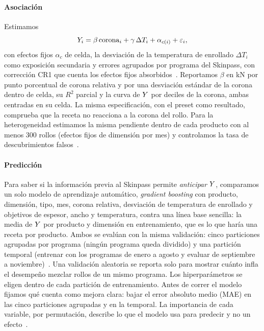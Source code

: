 \paragraph{Asociación} Estimamos
\begin{equation}
Y_i = \beta\, \mathrm{corona}_i + \gamma\, \Delta T_i + \alpha_{c(i)} + \varepsilon_i ,
\label{eq:fe}
\end{equation}
con efectos fijos $\alpha_c$ de celda, la desviación de la temperatura de enrollado $\Delta T_i$ como exposición
secundaria y errores agrupados por programa del Skinpass, con corrección CR1 que cuenta los efectos fijos
absorbidos~\cite{cameron2015}. Reportamos $\beta$ en kN por punto porcentual de corona relativa y por una desviación
estándar de la corona dentro de celda, su $R^2$ parcial y la curva de $Y$ por deciles de la corona, ambas centradas en
su celda. La misma especificación, con el preset como resultado, comprueba que la receta no reacciona a la corona del
rollo. Para la heterogeneidad estimamos la misma pendiente dentro de cada producto con al menos 300 rollos (efectos fijos
de dimensión por mes) y controlamos la tasa de descubrimientos falsos~\cite{benjamini1995}.

\paragraph{Predicción} Para saber si la información previa al Skinpass permite \emph{anticipar} $Y$, comparamos un
solo modelo de aprendizaje automático, \emph{gradient boosting} con producto, dimensión, tipo, mes, corona relativa,
desviación de temperatura de enrollado y objetivos de espesor, ancho y temperatura, contra una línea base sencilla: la
media de $Y$ por producto y dimensión en entrenamiento, que es lo que haría una receta por producto. Ambos se evalúan
con la misma validación: cinco particiones agrupadas por programa (ningún programa queda dividido) y una partición
temporal (entrenar con los programas de enero a agosto y evaluar de septiembre a noviembre)~\cite{roberts2017}. Una
validación aleatoria se reporta solo para mostrar cuánto infla el desempeño mezclar rollos de un mismo programa. Los
hiperparámetros se eligen dentro de cada partición de entrenamiento. Antes de correr el modelo fijamos qué cuenta como
mejora clara: bajar el error absoluto medio (MAE) en las cinco particiones agrupadas y en la temporal. La importancia de
cada variable, por permutación, describe lo que el modelo usa para predecir y no un efecto~\cite{shmueli2010}.

